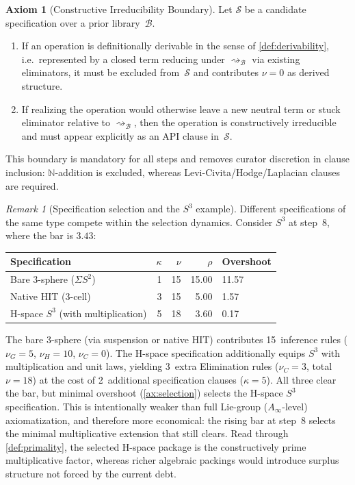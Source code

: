 \documentclass[11pt,a4paper]{article}
\theoremstyle{plain}
\theoremstyle{definition}
\newtheorem{axiom}[theorem]{Axiom}
\theoremstyle{remark}
\newtheorem{remark}[theorem]{Remark}
\newcommand{\N}{\mathbb{N}}
\begin{document}
\begin{axiom}[Constructive Irreducibility Boundary]
\label{ax:constructive-irreducibility}
Let $\mathcal{S}$ be a candidate specification over a prior library~$\mathcal{B}$.
\begin{enumerate}[nosep]
    \item If an operation is definitionally derivable in the sense of \cref{def:derivability}, i.e.\ represented by a closed term reducing under $\rightsquigarrow_{\mathcal{B}}$ via existing eliminators, it must be excluded from~$\mathcal{S}$ and contributes $\nu=0$ as derived structure.
    \item If realizing the operation would otherwise leave a new neutral term or stuck eliminator relative to $\rightsquigarrow_{\mathcal{B}}$, then the operation is constructively irreducible and must appear explicitly as an API clause in~$\mathcal{S}$.
\end{enumerate}
This boundary is mandatory for all steps and removes curator discretion in clause inclusion: $\N$-addition is excluded, whereas Levi-Civita/Hodge/Laplacian clauses are required.
\end{axiom}

\begin{remark}[Specification selection and the $S^3$ example]
\label{rem:kolmogorov-ambiguity}
Different specifications of the same type compete within the selection dynamics.
Consider $S^3$ at step~8, where the bar is $3.43$:
\begin{center}
\small
\begin{tabular}{@{}lrrrl@{}}
\toprule
Specification & $\kappa$ & $\nu$ & $\rho$ & Overshoot \\
\midrule
Bare 3-sphere ($\Sigma S^2$) & 1 & 15 & 15.00 & 11.57 \\
Native HIT (3-cell)          & 3 & 15 &  5.00 &  1.57 \\
H-space $S^3$ (with multiplication)    & 5 & 18 &  3.60 &  0.17 \\
\bottomrule
\end{tabular}
\end{center}
The bare 3-sphere (via suspension or native HIT) contributes 15~inference rules ($\nu_G = 5$, $\nu_H = 10$, $\nu_C = 0$).
The H-space specification additionally equips $S^3$ with multiplication and unit laws, yielding 3~extra Elimination rules ($\nu_C = 3$, total $\nu = 18$) at the cost of 2~additional specification clauses ($\kappa = 5$).
All three clear the bar, but minimal overshoot (\cref{ax:selection}) selects the H-space $S^3$ specification.
This is intentionally weaker than full Lie-group ($A_\infty$-level) axiomatization, and therefore more economical: the rising bar at step~8 selects the minimal multiplicative extension that still clears.
Read through \cref{def:primality}, the selected H-space package is the constructively prime multiplicative factor, whereas richer algebraic packings would introduce surplus structure not forced by the current debt.
\end{remark}
\end{document}
